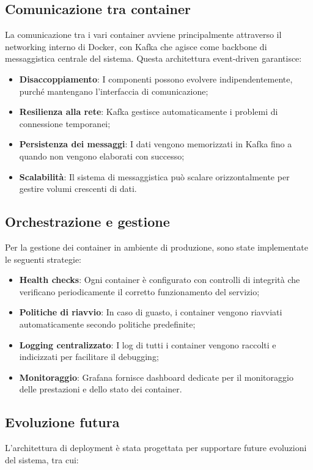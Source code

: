 \documentclass[10pt]{article}
\begin{document}
\subsection{Comunicazione tra container}
La comunicazione tra i vari container avviene principalmente attraverso il networking interno di Docker, con Kafka che agisce come backbone di messaggistica centrale del sistema. Questa architettura event-driven garantisce:

\begin{itemize}
    \item \textbf{Disaccoppiamento}: I componenti possono evolvere indipendentemente, purché mantengano l'interfaccia di comunicazione;
    \item \textbf{Resilienza alla rete}: Kafka gestisce automaticamente i problemi di connessione temporanei;
    \item \textbf{Persistenza dei messaggi}: I dati vengono memorizzati in Kafka fino a quando non vengono elaborati con successo;
    \item \textbf{Scalabilità}: Il sistema di messaggistica può scalare orizzontalmente per gestire volumi crescenti di dati.
\end{itemize}

\subsection{Orchestrazione e gestione}
Per la gestione dei container in ambiente di produzione, sono state implementate le seguenti strategie:

\begin{itemize}
    \item \textbf{Health checks}: Ogni container è configurato con controlli di integrità che verificano periodicamente il corretto funzionamento del servizio;
    \item \textbf{Politiche di riavvio}: In caso di guasto, i container vengono riavviati automaticamente secondo politiche predefinite;
    \item \textbf{Logging centralizzato}: I log di tutti i container vengono raccolti e indicizzati per facilitare il debugging;
    \item \textbf{Monitoraggio}: Grafana fornisce dashboard dedicate per il monitoraggio delle prestazioni e dello stato dei container.
\end{itemize}

\subsection{Evoluzione futura}
L'architettura di deployment è stata progettata per supportare future evoluzioni del sistema, tra cui:
\end{document}
